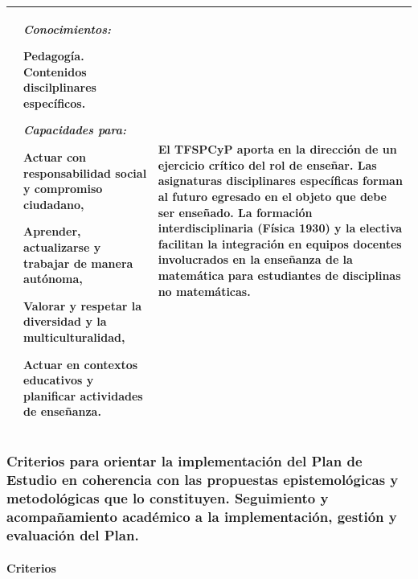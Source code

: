 \documentclass[a4paper, 12pt]{article}
\begin{document}
\begin{center}
\begin{tabularx}{1.0\textwidth}{|>{\raggedright\arraybackslash}X |
>{\raggedright\arraybackslash}X |
>{\raggedright\arraybackslash}X |
}
  & 
     \emph{Conocimientos:}
   
   Pedagogía.  Contenidos discilplinares específicos. 
   
   
   
   
   
   \emph{Capacidades para:}
  
   Actuar con responsabilidad social y compromiso ciudadano,
   
 Aprender, actualizarse y trabajar de manera autónoma,
 

 Valorar y respetar la diversidad y la multiculturalidad,
 
 
 Actuar en contextos educativos y planificar actividades de enseñanza.

  
  
  &  El TFSPCyP aporta en la dirección de un ejercicio crítico del rol de enseñar. Las asignaturas disciplinares específicas forman al futuro egresado en el objeto que debe ser enseñado. La formación interdisciplinaria (Física 1930) y la electiva  facilitan la integración en equipos docentes involucrados en la enseñanza de la matemática para estudiantes de disciplinas no matemáticas. \\ \hline
\end{tabularx}
\end{center}
\normalsize


\subsubsection{Criterios para orientar la implementación del Plan de Estudio en coherencia con las propuestas epistemológicas y metodológicas que lo constituyen. Seguimiento y acompañamiento académico a la implementación, gestión y evaluación del Plan.
} 

\paragraph{Criterios}
\end{document}
